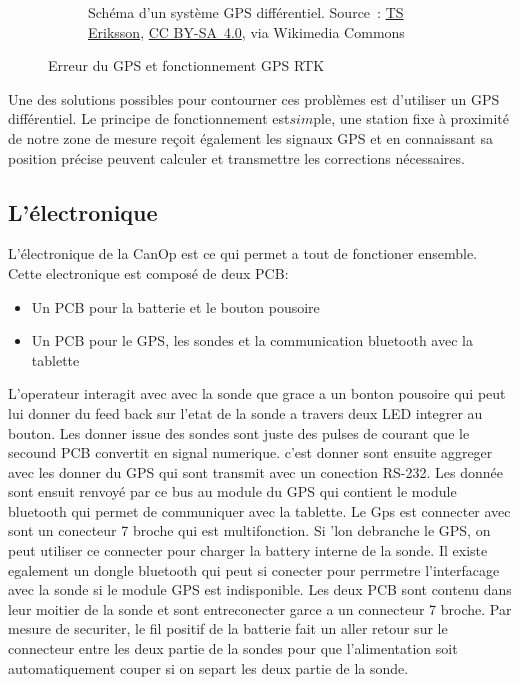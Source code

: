 \begin{figure}
\begin{subfigure}[t]{0.5\textwidth}
        \caption[Shema d'un systeme GPS differenciel]{Schéma d'un système GPS différentiel. Source~: \href{https://commons.wikimedia.org/wiki/File:Real_time_kinematic.svg}{TS Eriksson}, \href{https://creativecommons.org/licenses/by-sa/4.0}{CC BY-SA~4.0}, via Wikimedia Commons}
        \label{fig_RTK}
    \end{subfigure}
    \caption{Erreur du GPS et fonctionnement GPS RTK}
\end{figure}

Une des solutions possibles pour contourner ces problèmes est d'utiliser un GPS différentiel. Le principe de fonctionnement est$ sim$ple, une station fixe à proximité de notre zone de mesure reçoit également les signaux GPS et en connaissant sa position précise peuvent calculer et transmettre les corrections nécessaires. \cite{site:GPS_diff}

\subsection{L'électronique}

L'électronique de la CanOp est ce qui permet a tout de fonctioner ensemble. Cette electronique est composé de deux PCB:
\begin{itemize}
    \item Un PCB pour la batterie et le bouton pousoire
    \item Un PCB pour le GPS, les sondes et la communication bluetooth avec la tablette
\end{itemize}

L'operateur interagit avec avec la sonde que grace a un bonton pousoire qui peut lui donner du feed back sur l'etat de la sonde a travers deux LED integrer au bouton. Les donner issue des sondes sont juste des pulses de courant que le secound PCB convertit en signal numerique. c'est donner sont ensuite aggreger avec les donner du GPS qui sont transmit avec un conection RS-232. Les donnée sont ensuit renvoyé par ce bus au module du GPS qui contient le module bluetooth qui permet de communiquer avec la tablette. Le Gps est connecter avec sont un conecteur 7 broche qui est multifonction. Si 'lon debranche le GPS, on peut utiliser ce connecter pour charger la battery interne de la sonde. Il existe egalement un dongle bluetooth qui peut si conecter pour perrmetre l'interfacage avec la sonde si le module GPS est indisponible. Les deux PCB sont contenu dans leur moitier de la sonde et sont entreconecter garce a un connecteur 7 broche. Par mesure de securiter, le fil positif de la batterie fait un aller retour sur le connecteur entre les deux partie de la sondes pour que l'alimentation soit automatiquement couper si on separt les deux partie de la sonde.